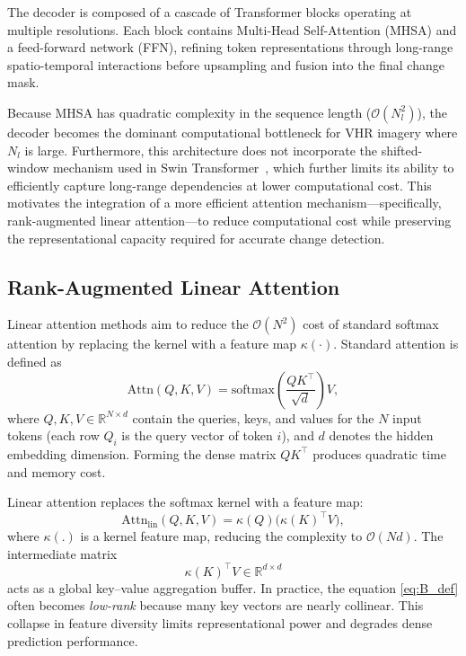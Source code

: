 \documentclass[runningheads]{llncs}
\begin{document}
The decoder is composed of a cascade of Transformer blocks operating at
multiple resolutions. Each block contains Multi-Head Self-Attention (MHSA) and
a feed-forward network (FFN), refining token representations through long-range
spatio-temporal interactions before upsampling and fusion into the final change
mask.

Because MHSA has quadratic complexity in the sequence length
($\mathcal{O}(N_l^2)$), the decoder becomes the dominant computational
bottleneck for VHR imagery where $N_l$ is large. Furthermore, this
architecture does not incorporate the shifted-window mechanism used in Swin
Transformer~\cite{Teng2023SwinCD}, which further limits its ability to
efficiently capture long-range dependencies at lower computational cost. This
motivates the integration of a more efficient attention mechanism—specifically,
rank-augmented linear attention—to reduce computational cost while preserving
the representational capacity required for accurate change detection.


\subsection{Rank-Augmented Linear Attention}
\label{subsec:rala}

Linear attention methods aim to reduce the $\mathcal{O}(N^2)$ cost of standard
softmax attention by replacing the kernel with a feature map $\kappa(\cdot)$.
Standard attention is defined as
\begin{equation}
\mathrm{Attn}(Q,K,V)=\mathrm{softmax}\!\left(\frac{QK^\top}{\sqrt{d}}\right)V,
\label{eq:softmax_attention}
\end{equation}
where $Q,K,V\in\mathbb{R}^{N\times d}$ \cite{Vaswani2017Attention} contain the
queries, keys, and values for the $N$ input tokens (each row $Q_i$ is the
query vector of token $i$), and $d$ denotes the hidden embedding dimension.
Forming the dense matrix $QK^\top$ produces quadratic time and memory cost.

Linear attention replaces the softmax kernel with a feature map:
\begin{equation}
\mathrm{Attn}_{\text{lin}}(Q,K,V)=\kappa(Q)\big(\kappa(K)^\top V\big),
\label{eq:linear_attention}
\end{equation}
where $\mathcal{\kappa(.)}$ is a kernel feature map, reducing the complexity to
$\mathcal{O}(Nd)$.
The intermediate matrix
\begin{equation}
\kappa(K)^\top V \in\mathbb{R}^{d\times d}
\label{eq:B_def}
\end{equation}
acts as a global key–value aggregation buffer. In practice, the
equation \ref{eq:B_def} often becomes \emph{low-rank} because many key vectors
are nearly collinear. This collapse in feature diversity limits
representational power and degrades dense prediction performance.
\end{document}
